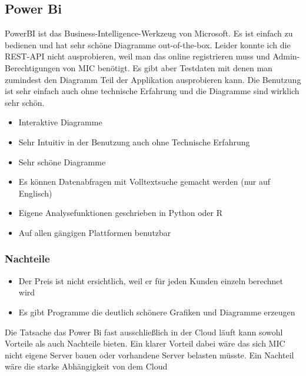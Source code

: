 \subsection{Power Bi}
PowerBI ist das Business-Intelligence-Werkzeug von Microsoft. Es ist einfach zu bedienen und hat sehr schöne Diagramme out-of-the-box. Leider konnte ich die REST-API nicht ausprobieren, weil man das online registrieren muss und Admin-Berechtigungen von MIC benötigt. Es gibt aber Testdaten mit denen man zumindest den Diagramm Teil der Applikation ausprobieren kann. Die Benutzung ist sehr einfach auch ohne technische Erfahrung und die Diagramme sind wirklich sehr schön.
\begin{itemize}
\item Interaktive Diagramme
\item Sehr Intuitiv in der Benutzung auch ohne Technische Erfahrung
\item Sehr schöne Diagramme
\item Es können Datenabfragen mit Volltextsuche gemacht werden (nur auf Englisch)
\item Eigene Analysefunktionen geschrieben in Python oder R
\item Auf allen gängigen Plattformen benutzbar
\end{itemize}
\subsubsection{Nachteile}
\begin{itemize}
\item Der Preis ist nicht ersichtlich, weil er für jeden Kunden einzeln berechnet wird
\item Es gibt Programme die deutlich schönere Grafiken und Diagramme erzeugen
\end{itemize}
Die Tatsache das Power Bi fast ausschließlich in der Cloud läuft kann sowohl Vorteile als auch Nachteile bieten. Ein klarer Vorteil dabei wäre das sich MIC nicht eigene Server bauen oder vorhandene Server belasten müsste. Ein Nachteil wäre die starke Abhängigkeit von dem Cloud
